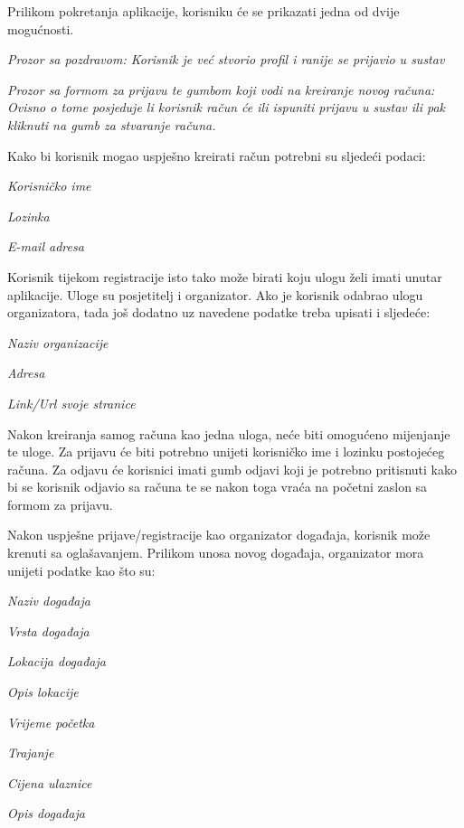 		Prilikom pokretanja aplikacije, korisniku će se prikazati jedna od dvije mogućnosti. 
		
		\begin{packed_item}
			\item \textit{Prozor sa pozdravom: Korisnik je već stvorio profil i ranije se prijavio u sustav}
			\item \textit{Prozor sa formom za prijavu te gumbom koji vodi na kreiranje novog računa: Ovisno o tome posjeduje li korisnik račun će ili ispuniti prijavu u sustav ili pak kliknuti na gumb za stvaranje računa. }
		\end{packed_item}
		 Kako bi korisnik mogao uspješno kreirati račun potrebni su sljedeći podaci:
		\begin{packed_item}
			\item \textit{Korisničko ime}
			\item \textit{Lozinka}
			\item \textit{E-mail adresa}
		\end{packed_item}
		Korisnik tijekom registracije isto tako može birati koju ulogu želi imati unutar aplikacije. Uloge su posjetitelj i organizator.
		Ako je korisnik odabrao ulogu organizatora, tada još dodatno uz navedene podatke treba upisati i sljedeće:
		\begin{packed_item}
			\item \textit{Naziv organizacije}
			\item \textit{Adresa}
			\item \textit{Link/Url svoje stranice}
		\end{packed_item}
		
		Nakon kreiranja samog računa kao jedna uloga, neće biti omogućeno mijenjanje  te uloge. 
		Za prijavu će biti potrebno unijeti korisničko ime i lozinku postojećeg računa. Za odjavu će korisnici imati gumb odjavi koji je potrebno pritisnuti kako bi se korisnik odjavio sa računa te se nakon toga vraća na početni zaslon sa formom za prijavu.
		
		Nakon uspješne prijave/registracije kao organizator događaja, korisnik može krenuti sa oglašavanjem. Prilikom unosa novog događaja, organizator mora unijeti podatke kao što su: 
		\begin{packed_item}
			\item \textit{Naziv događaja}
			\item \textit{Vrsta događaja}
			\item \textit{Lokacija događaja}
			\item \textit{Opis lokacije}
			\item \textit{Vrijeme početka}
			\item \textit{Trajanje}
			\item \textit{Cijena ulaznice}
			\item \textit{Opis događaja}
		\end{packed_item}
		

